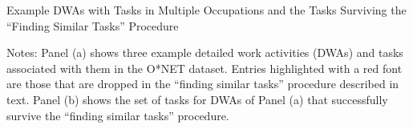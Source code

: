\begin{landscape}
\begin{table}[p]
\caption{Example DWAs with Tasks in Multiple Occupations and the Tasks Surviving the ``Finding Similar Tasks'' Procedure}
\label{tab:DWA_tasks}


\begin{minipage}{1\linewidth}
\begin{spacing}{0.2}
{\fontsize{9.5pt}{10pt}\selectfont Notes: Panel (a) shows three example detailed work activities (DWAs) and tasks associated with them in the O*NET dataset.
Entries highlighted with a red font are those that are dropped in the ``finding similar tasks'' procedure described in text.
Panel (b) shows the set of tasks for DWAs of Panel (a) that successfully survive the ``finding similar tasks'' procedure.}
\end{spacing}
\end{minipage}
\end{table}
\end{landscape}